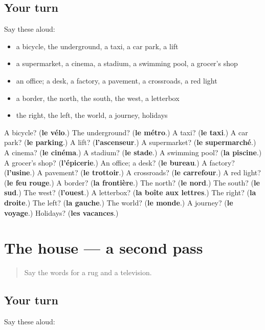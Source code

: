 \subsection*{Your turn}
Say these aloud:

\begin{itemize}
\raggedright
  \item a bicycle, the underground, a taxi, a car park, a lift
  \item a supermarket, a cinema, a stadium, a swimming pool, a grocer's shop
  \item an office; a desk, a factory, a pavement, a crossroads, a red light
  \item a border, the north, the south, the west, a letterbox
  \item the right, the left, the world, a journey, holidays
\end{itemize}

\begin{tcolorbox}[breakable,colback=teal!4,colframe=teal!35!black,title={Before you move on}]
A bicycle? (\textbf{le vélo}.) The underground? (\textbf{le métro}.) A taxi? (\textbf{le taxi}.) A car park? (\textbf{le parking}.) A lift? (\textbf{l'ascenseur}.) A supermarket? (\textbf{le supermarché}.) A cinema? (\textbf{le cinéma}.) A stadium? (\textbf{le stade}.) A swimming pool? (\textbf{la piscine}.) A grocer's shop? (\textbf{l'épicerie}.) An office; a desk? (\textbf{le bureau}.) A factory? (\textbf{l'usine}.) A pavement? (\textbf{le trottoir}.) A crossroads? (\textbf{le carrefour}.) A red light? (\textbf{le feu rouge}.) A border? (\textbf{la frontière}.) The north? (\textbf{le nord}.) The south? (\textbf{le sud}.) The west? (\textbf{l'ouest}.) A letterbox? (\textbf{la boîte aux lettres}.) The right? (\textbf{la droite}.) The left? (\textbf{la gauche}.) The world? (\textbf{le monde}.) A journey? (\textbf{le voyage}.) Holidays? (\textbf{les vacances}.)
\end{tcolorbox}
\section[(dialogue)]{The house — a second pass}

\label{lesson:FR-R116-second-pass-the-house}



\begin{quote}
Say the words for a rug and a television.
\end{quote}

\subsection*{Your turn}
Say these aloud:

